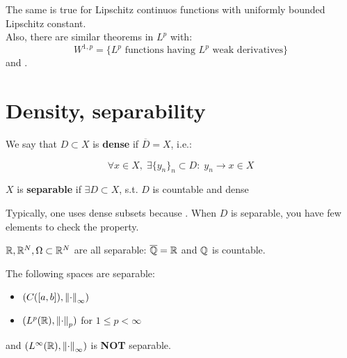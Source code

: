 \begin{fremark}
    The same is true for Lipschitz continuos functions with uniformly bounded Lipschitz constant.\\

    Also, there are similar theorems in $L^p$ with:
    $$W^{1, p} = \{L^p \text{ functions having } L^p \text{ weak derivatives}\}$$
    and .
\end{fremark}

\section{Density, separability}

\begin{fdefinition}
    We say that $D \subset X$ is \textbf{dense} if $\overline{D} = X$, i.e.:

    $$\forall x \in X, \; \exists \{y_n\}_n \subset D: \; y_n \to x \in X$$
\end{fdefinition}

\vspace{1em}

\begin{fdefinition}
    $X$ is \textbf{separable} if $\exists D \subset X$, s.t. $D$ is countable and dense
\end{fdefinition}

\begin{fremark}
    Typically, one uses dense subsets because .
    When $D$ is separable, you have few elements to check the property. 
\end{fremark}

\begin{example}
    $\mathbb{R}, \mathbb{R}^N, \Omega \subset \mathbb{R}^N$ are all separable: $\overline{\mathbb{Q}} = \mathbb{R}$ and $\mathbb{Q}$ is countable.
\end{example}

\begin{ftheorem}
    The following spaces are separable:
    \vspace{1em}
    \begin{itemize}
        \item $(C([a, b]), \left\|\cdot\right\|_{\infty})$
        \vspace{1em}
        \item $(L^p(\mathbb{R}), \left\|\cdot\right\|_p)$ for $1 \leq p < \infty$
    \end{itemize}
    \vspace{1em}
    and $(L^{\infty}(\mathbb{R}), \left\|\cdot\right\|_{\infty})$ is \textbf{NOT} separable.
\end{ftheorem}

